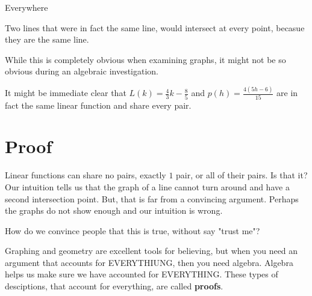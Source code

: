 \documentclass{ximera}
\begin{document}
\begin{example} Everywhere 

Two lines that were in fact the same line, would intersect at every point, becasue they are the same line.
\begin{image}
\end{image}


While this is completely obvious when examining graphs, it might not be so obvious during an algebraic investigation.

It might be immediate clear that $L(k) = \frac{4}{3}k - \frac{8}{5}$ and $p(h) = \frac{4(5h-6)}{15}$ are in fact the same linear function and share every pair.

\end{example}










\section{Proof}



Linear functions can share no pairs, exactly $1$ pair, or all of their pairs.  Is that it?  Our intuition tells us that the graph of a line cannot turn around and have a second intersection point.  But, that is far from a convincing argument.  Perhaps the graphs do not show enough and our intuition is wrong.  

How do we convince people that this is true, without say "trust me"?

Graphing and geometry are excellent tools for believing, but when you need an argument that accounts for EVERYTHIUNG, then you need algebra.  Algebra helps us make sure we have accounted for EVERYTHING.  These types of desciptions, that account for everything, are called \textbf{proofs}.
\end{document}
